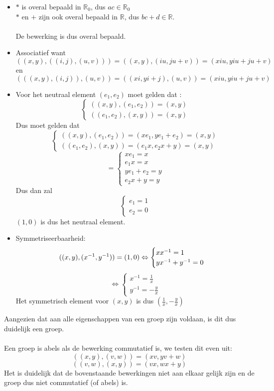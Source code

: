 \documentclass[11pt,a4paper,titlepage]{article}
\begin{document}
\begin{itemize}
	\item $*$ is overal bepaald in $\mathbb{R}_0$, dus $ac \in \mathbb{R}_0$\\
		 $*$ en $+$ zijn ook overal bepaald in $\mathbb{R}$, dus $bc + d \in \mathbb{R}$. \\
		\\ De bewerking is dus overal bepaald.
	\item Associatief want
		$$((x,y),((i,j),(u,v))) = ((x,y),(iu,ju+v)) = (xiu,yiu+ju+v)$$
		en
		$$(((x,y),(i,j)),(u,v)) = ((xi,yi+j),(u,v)) = (xiu, yiu + ju + v)$$
	\item Voor het neutraal element $(e_1,e_2)$ moet gelden dat :
			$$\begin{cases}
				((x,y),(e_1,e_2)) = (x,y) \\
				((e_1,e_2),(x,y)) = (x,y)
			\end{cases}$$
		Dus moet gelden dat
			$$\begin{cases}
				((x,y),(e_1,e_2)) = (x e_1,y e_1 + e_2) =  (x,y) \\
				((e_1,e_2),(x,y)) = (e_1 x,e_2 x+y) = (x,y)
			\end{cases}$$
			$$= \begin{cases}
					x e_1 = x \\
					e_1 x = x \\
					y e_1 + e_2 = y \\
					e_2 x+y = y 
			\end{cases}$$
		Dus dan zal
			$$\begin{cases}
					e_1 = 1 \\
					e_2 = 0
			\end{cases}$$
		$(1,0)$ is dus het neutraal element.
	\item Symmetriseerbaarheid:
		$$((x,y),(x^{-1},y^{-1})) = (1,0) \\
			\Leftrightarrow 
				\begin{cases}
					xx^{-1} = 1\\
					yx^{-1} + y^{-1} = 0
				\end{cases}$$
		$$\Leftrightarrow
			\begin{cases}
				x^{-1} = \frac{1}{x} \\
				y^{-1} = -\frac{y}{x}
			\end{cases}
		$$
		Het symmetrisch element voor $(x,y)$ is dus $(\frac{1}{x},-\frac{y}{x})$
\end{itemize}
Aangezien dat aan alle eigenschappen van een groep zijn voldaan, is dit dus duidelijk een groep. \\ \\
Een groep is abels als de bewerking commutatief is, we testen dit even uit:
	$$((x,y),(v,w)) = (xv,yv+w)$$
	$$((v,w),(x,y)) = (vx,wx+y)$$
Het is duidelijk dat de bovenstaande bewerkingen niet aan elkaar gelijk zijn en de groep dus niet commutatief (of abels) is.
\end{document}
